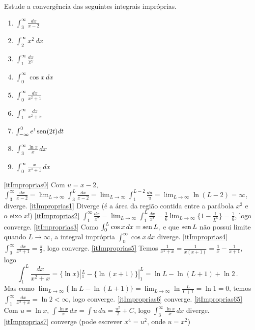 \begin{exo}
Estude a convergência das seguintes integrais impróprias.
\begin{multicols}{3}
\begin{enumerate}
\item\label{itImproprias0} $\int_3^\infty\frac{dx}{x-2}$
\item\label{itImproprias1} $\int_{2}^\infty x^2\,dx$
\item\label{itImproprias2} $\int_{1}^\infty \tfrac{dx}{x^7}$
\item\label{itImproprias3} $\int_0^\infty\cos x\,dx$
\item\label{itImproprias4} $\int_{0}^\infty \frac{dx}{x^2+1}$
\item\label{itImproprias5} $\int_{1}^\infty \frac{dx}{x^2+x}$
\item\label{itImproprias6} $\int_{-\infty}^0 e^{t}\operatorname{sen}(2t)dt$
\item\label{itImproprias65} $\int_{3}^\infty \frac{\ln x}{x}\,dx$
\item\label{itImproprias7} $\int_0^\infty\frac{x}{x^4+1}\,dx$
\end{enumerate}
\end{multicols}
\vspace{0.01cm}
\begin{sol}
\eqref{itImproprias0} Com $u=x-2$,
$\int_3^\infty\frac{dx}{x-2}=\lim_{L\to \infty}\int_3^L\frac{dx}{x-2}=
\lim_{L\to \infty}\int_1^{L-2}\frac{du}{u}=\lim_{L\to \infty}\ln(L-2)=\infty
$, diverge.
\eqref{itImproprias1} Diverge (é a área da região contida entre a parábola
$x^2$ e o eixo $x$!)
\eqref{itImproprias2} $\int_{1}^\infty
\tfrac{dx}{x^7}=\lim_{L\to\infty}\int_{1}^L \tfrac{dx}{x^7}=
\tfrac16\lim_{L\to\infty}\{1-\frac{1}{L^6}\}=\tfrac16$, logo converge.
\eqref{itImproprias3} Como $\int_0^L\cos x\,dx=\operatorname{sen} L$, e que $\operatorname{sen} L$ não
possui limite quando $L\to \infty$, a integral imprópria $\int_0^\infty\cos
x\,dx$ diverge.
\eqref{itImproprias4} $\int_{0}^\infty \frac{dx}{x^2+1}=\frac{\pi}{2}$, logo
converge.
\eqref{itImproprias5} Temos
$\frac{1}{x^2+x}=\frac{1}{x(x+1)}=\frac{1}{x}-\frac{1}{x+1}$, logo
$$\int_1^L\frac{dx}{x^2+x}=\{\ln x\}|_1^L-\{\ln(x+1)\}|_1^L
=\ln L-\ln(L+1)+\ln 2\,.
$$
Mas como $\lim_{L\to \infty}\{\ln L-\ln(L+1)\}=
\lim_{L\to \infty}\ln\frac{L}{L+1}=\ln 1=0$, temos
$\int_{1}^\infty \frac{dx}{x^2+x}=\ln 2<\infty$, logo converge.
\eqref{itImproprias6} converge.
\eqref{itImproprias65} Com $u=\ln x$, $\int\frac{\ln x}{x}\,dx=\int
u\,du=\frac{u^2}{2}+C$, logo $\int_{3}^\infty \frac{\ln x}{x}\,dx$ diverge.
\eqref{itImproprias7} converge (pode escrever $x^4=u^2$, onde $u=x^2$)
\end{sol}
\end{exo}

